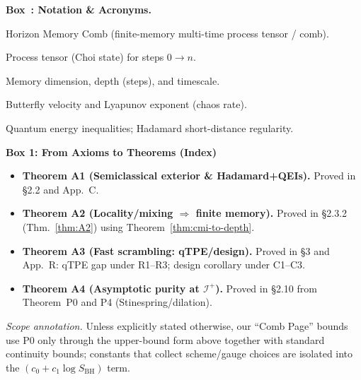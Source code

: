 \documentclass[11pt,a4paper]{article}
\newcounter{boxedresult}
\newenvironment{boxedresult}[1]{\refstepcounter{boxedresult}\begin{infobox}\noindent\textbf{Box~\theboxedresult: #1.}}{\end{infobox}}
\theoremstyle{plain}
\theoremstyle{definition}
\theoremstyle{remark}
\begin{document}
\begin{boxedresult}{Notation \& Acronyms}
\small
\begin{description}[leftmargin=2.2em,labelsep=0.4em,itemsep=0.2em,topsep=0.2em]
\item[HMC] Horizon Memory Comb (finite-memory multi-time process tensor / comb).
\item[$\Upsilon_{n{:}0}$] Process tensor (Choi state) for steps $0\to n$.
\item[$d_{\rm mem},\,\ell_{\rm mem},\,\tau_{\rm mem}$] Memory dimension, depth (steps), and timescale.
\item[$v_B,\,\lambda_L$] Butterfly velocity and Lyapunov exponent (chaos rate).
\item[QEIs/Hadamard] Quantum energy inequalities; Hadamard short-distance regularity.
\end{description}
\end{boxedresult}
 
\begin{center}
\noindent\textbf{Box 1: From Axioms to Theorems (Index)}\\[2pt]
\begin{itemize}
  \item \textbf{Theorem A1 (Semiclassical exterior \& Hadamard+QEIs).} Proved in \S2.2 and App.~C.
  \item \textbf{Theorem A2 (Locality/mixing $\Rightarrow$ finite memory).} Proved in \S2.3.2 (Thm.~\ref{thm:A2}) using Theorem~\ref{thm:cmi-to-depth}.
  \item \textbf{Theorem A3 (Fast scrambling: qTPE/design).} Proved in \S3 and App.~R: qTPE gap under R1--R3; design corollary under C1--C3.
  \item \textbf{Theorem A4 (Asymptotic purity at $\mathscr I^+$).} Proved in \S2.10 from Theorem~P0 and P4 (Stinespring/dilation).
\end{itemize}
\end{center}%

\noindent\emph{Scope annotation.}
Unless explicitly stated otherwise, our ``Comb Page'' bounds use P0 only through the upper-bound form above together with standard continuity bounds; constants that collect scheme/gauge choices are isolated into the \((c_0+c_1\log S_{\mathrm{BH}})\) term.
\end{document}
